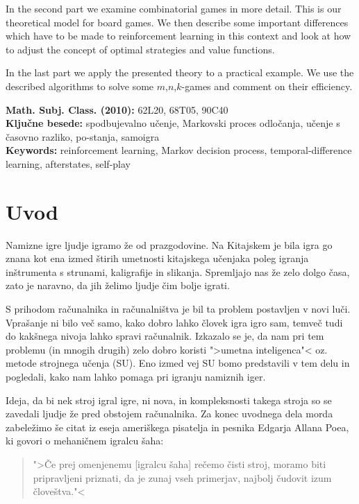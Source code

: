 \documentclass[12pt,a4paper]{amsart}
\theoremstyle{definition} %
\theoremstyle{plain} %
\begin{document}
In the second part we examine combinatorial games in more detail. This is our theoretical model for board 
games. We then describe some important differences which have to be made to reinforcement learning in 
this context and look at how to adjust the concept of optimal strategies and value functions.

In the last part we apply the presented theory to a practical example. We use the described algorithms to 
solve some $m$,$n$,$k$-games and comment on their efficiency.

\vfill\noindent
{\bf Math. Subj. Class. (2010):} 62L20, 68T05, 90C40  \\[1mm]  %
{\bf Ključne besede:} spodbujevalno učenje, Markovski proces odločanja, učenje s časovno razliko, 
                      po-stanja, samoigra \\[1mm]  
{\bf Keywords:} reinforcement learning, Markov decision process, temporal-difference learning,  
                afterstates, self-play
\pagebreak



\section{Uvod}
Namizne igre ljudje igramo že od prazgodovine. Na Kitajskem je bila igra go znana kot ena 
izmed štirih umetnosti kitajskega učenjaka poleg igranja inštrumenta s strunami, kaligrafije
in slikanja. Spremljajo nas že zelo dolgo časa, zato je naravno, da jih želimo ljudje čim
bolje igrati.

S prihodom računalnika in računalništva je bil ta problem postavljen v novi luči. Vprašanje
ni bilo več samo, kako dobro lahko človek igra igro sam, temveč tudi do kakšnega nivoja 
lahko spravi računalnik. Izkazalo se je, da nam pri tem problemu (in mnogih drugih) zelo dobro
koristi ">umetna inteligenca"< oz. metode strojnega učenja (SU). Eno izmed vej SU bomo 
predstavili v tem delu in pogledali, kako nam lahko pomaga pri igranju namiznih iger.

Ideja, da bi nek stroj igral igre, ni nova, in kompleksnosti takega stroja so se zavedali ljudje
že pred obstojem računalnika. 
Za konec uvodnega dela morda zabeležimo še citat iz eseja ameriškega pisatelja in pesnika 
Edgarja Allana Poea, ki govori o mehaničnem igralcu šaha: 

\begin{quotation}
    ">Če prej omenjenemu [igralcu šaha] rečemo čisti stroj, moramo biti pripravljeni priznati, da je
    zunaj vseh primerjav, najbolj čudovit izum človeštva."<
\end{quotation}
\end{document}
